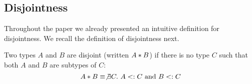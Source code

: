 %
%
%

\subsection{Disjointness} Throughout the paper we already presented an intuitive
definition for disjointness. 
We recall the definition of disjointness next.

\begin{comment}
\begin{definition}[Disjoint types]

  Two types $A$ and $B$ are said to be disjoint (written $\jdis \Gamma A B$) if
  they do not share a common supertype - excluding top-like types. 
  That is, for all type $C$ such that $A \subtype C$ and $B \subtype C$, then $\toplike{C}$ must hold.

  \[\jdis \Gamma A B \equiv \forall C.~A \subtype C \wedge B \subtype C \Rightarrow \toplike{C}\]

\end{definition}
\end{comment}

\begin{definition}\label{def:simple_dis}
  Two types $A$ and $B$ are disjoint
  (written $A * B$) if there is no type $C$ such that both $A$ and $B$ are
  subtypes of $C$:
  \[A * B \equiv \not\exists C.~A <: C~\text{and}~B <: C\]
\end{definition}

